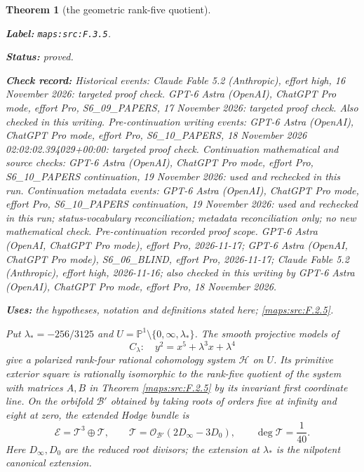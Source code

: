 \documentclass[11pt,a4paper]{article}
\newtheorem{theorem}{Theorem}[section]
\theoremstyle{definition}
\newcommand{\StatementRecord}[4]{\par\smallskip\begingroup\upshape\raggedright\noindent\textbf{Label:} \nolinkurl{#1}.\par\noindent\textbf{Status:} #2.\par\noindent\textbf{Check record:} #3.\par\noindent\textbf{Uses:} #4.\par\endgroup\smallskip}
\begin{document}
\begin{theorem}[the geometric rank-five quotient]\label{maps:src:F.3.5}
\StatementRecord{maps:src:F.3.5}{proved}{Historical events: Claude Fable 5.2 (Anthropic), effort high, 16 November 2026: targeted proof check. GPT-6 Astra (OpenAI), ChatGPT Pro mode, effort Pro, S6\_09\_PAPERS, 17 November 2026: targeted proof check. Also checked in this writing. Pre-continuation writing events: GPT-6 Astra (OpenAI), ChatGPT Pro mode, effort Pro, S6\_10\_PAPERS, 18 November 2026 02:02:02.394029+00:00: targeted proof check. Continuation mathematical and source checks: GPT-6 Astra (OpenAI), ChatGPT Pro mode, effort Pro, S6\_10\_PAPERS continuation, 19 November 2026: used and rechecked in this run. Continuation metadata events: GPT-6 Astra (OpenAI), ChatGPT Pro mode, effort Pro, S6\_10\_PAPERS continuation, 19 November 2026: used and rechecked in this run; status-vocabulary reconciliation; metadata reconciliation only; no new mathematical check. \emph{Pre-continuation recorded proof scope.} GPT-6 Astra (OpenAI, ChatGPT Pro mode), effort Pro, 2026-11-17; GPT-6 Astra (OpenAI, ChatGPT Pro mode), S6\_06\_BLIND, effort Pro, 2026-11-17; Claude Fable 5.2 (Anthropic), effort high, 2026-11-16; also checked in this writing by GPT-6 Astra (OpenAI), ChatGPT Pro mode, effort Pro, 18 November 2026}{the hypotheses, notation and definitions stated here; \cref{maps:src:F.2.5}}


Put $\lambda_*=-256/3125$ and
$U=\mathbb P^1\setminus\{0,\infty,\lambda_*\}$.  The smooth projective
models of
\[
 C_\lambda:\quad y^2=x^5+\lambda^3x+\lambda^4
 \tag{F.7}\label{maps:eq:F.7}
\]
give a polarized rank-four rational cohomology system $\mathcal H$ on
$U$.  Its primitive exterior square is rationally isomorphic to
the rank-five quotient of the system with matrices $A,B$ in
Theorem \ref{maps:src:F.2.5} by its invariant first coordinate line.
On the orbifold $\mathcal B'$ obtained by taking roots of orders
five at infinity and eight at zero, the extended Hodge bundle is
\[
 \mathcal E=\mathcal T^3\oplus\mathcal T,\qquad
 \mathcal T=\mathcal O_{\mathcal B'}(2D_\infty-3D_0),\qquad
 \deg\mathcal T=\frac1{40}.
 \tag{F.8}\label{maps:eq:F.8}
\]
Here $D_\infty,D_0$ are the reduced root divisors; the extension at
$\lambda_*$ is the nilpotent canonical extension.

\end{theorem}
\end{document}

